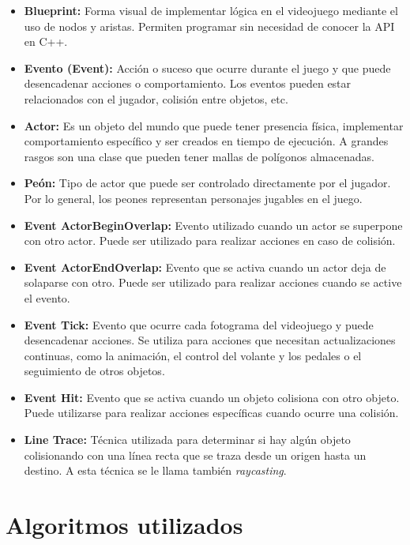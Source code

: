 \begin{itemize}
    \item \textbf{Blueprint: }Forma visual de implementar lógica en el videojuego mediante el uso de nodos y aristas. Permiten programar sin necesidad de conocer la API en C++.
    \item \textbf{Evento (Event): }Acción o suceso que ocurre durante el juego y que puede desencadenar acciones o comportamiento. Los eventos pueden estar relacionados con el jugador, colisión entre objetos, etc.
    \item \textbf{Actor: }Es un objeto del mundo que puede tener presencia física, implementar comportamiento específico y ser creados en tiempo de ejecución. A grandes rasgos son una clase que pueden tener mallas de polígonos almacenadas.
    \item \textbf{Peón: }Tipo de actor que puede ser controlado directamente por el jugador. Por lo general, los peones representan personajes jugables en el juego.
    \item \textbf{Event ActorBeginOverlap: }Evento utilizado cuando un actor se superpone con otro actor. Puede ser utilizado para realizar acciones en caso de colisión.
    \item \textbf{Event ActorEndOverlap: }Evento que se activa cuando un actor deja de solaparse con otro. Puede ser utilizado para realizar acciones cuando se active el evento.
    \item \textbf{Event Tick: }Evento que ocurre cada fotograma del videojuego y puede desencadenar acciones. Se utiliza para acciones que necesitan actualizaciones continuas, como la animación, el control del volante y los pedales o el seguimiento de otros objetos.
    \item \textbf{Event Hit: }Evento que se activa cuando un objeto colisiona con otro objeto. Puede utilizarse para realizar acciones específicas cuando ocurre una colisión.
    \item \textbf{Line Trace: }Técnica utilizada para determinar si hay algún objeto colisionando con una línea recta que se traza desde un origen hasta un destino. A esta técnica se le llama también \textit{raycasting}.
\end{itemize}

\newpage

\section{Algoritmos utilizados}

